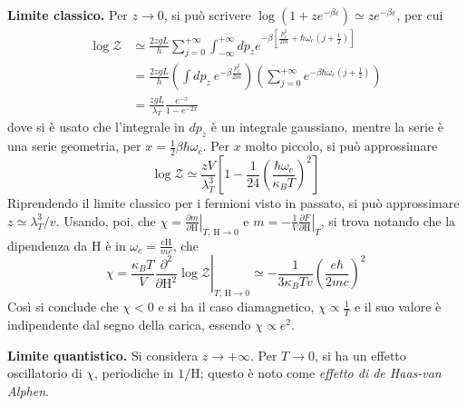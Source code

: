 \documentclass[11pt, a4paper]{scrartcl}
\theoremstyle{style}
\theoremstyle{style1}
\newcommand*\Eval[3]{\left.#1\right\rvert_{#2}^{#3}}
\numberwithin{equation}{subsection}
\begin{document}
\textbf{Limite classico.} Per $z\to 0$, si pu\`o scrivere $\log\left(1 + ze^{-\beta \varepsilon }\right) \simeq ze^{-\beta \varepsilon }$, per cui
\[
	\begin{split}
		\log\mathcal{Z}  &\simeq \frac{2zgL}{h}\sum_{j=0}^{+\infty} \int_{-\infty} ^{+\infty} dp_z e^{-\beta \left[ \frac{p_z^2}{2m}+\hbar \omega_c \left(j + \frac{1}{2}\right)  \right] }\\
				 &=\frac{2zgL}{h} \left( \int dp_z \ e^{-\beta \frac{p_z^2}{2m}} \right) \left( \sum_{j=0}^{+\infty} e^{-\beta \hbar \omega_c \left(j + \frac{1}{2}\right) } \right) \\
				 &= \frac{zgL}{\lambda _T}\frac{e^{-x}}{1 - e^{-2x}}
	\end{split}
\] 
dove si \`e usato che l'integrale in $dp_z$ \`e un integrale gaussiano, mentre la serie \`e una serie geometria, per $x = \frac{1}{2}\beta \hbar \omega_c$.
Per $x$ molto piccolo, si pu\`o approssimare
\[
\log\mathcal{Z} \simeq \frac{zV}{\lambda _T^3} \left[ 1-\frac{1}{24}\left(\frac{\hbar \omega_c}{\kappa _B T}\right) ^2 \right] 
\] 
Riprendendo il limite classico per i fermioni visto in passato, si pu\`o approssimare $z \simeq \lambda _T^3 / v$.
Usando, poi, che $\chi = \Eval{\frac{\partial m}{\partial \mathrm{H} } }{T,\, \mathrm{H} \to 0}{}$ e $m = - \frac{1}{V}\Eval{\frac{\partial F}{\partial \mathrm{H} } }{T}{}$, si trova notando che la dipendenza da $\mathrm{H} $ \`e in $\omega_c = \frac{e\mathrm{H} }{mc}$, che
\[
	\chi = \Eval{\frac{\kappa _B T }{V}\frac{\partial ^2 }{\partial \mathrm{H} ^2}  \log\mathcal{Z}}{T,\, \mathrm{H} \to  0}{} \simeq - \frac{1}{3\kappa _B T v}\left(\frac{e \hbar }{2mc}\right) ^2
\] 
Cos\`i si conclude che $\chi <0$ e si ha il caso diamagnetico, $\chi \propto \frac{1}{T}$ e il suo valore \`e indipendente dal segno della carica, essendo $\chi \propto e^2$.
\vspace{.5cm}

\textbf{Limite quantistico.} Si considera $z\to +\infty$. 
Per $T\to 0$, si ha un effetto oscillatorio di $\chi $, periodiche in $1 / \mathrm{H} $; questo \`e noto come \textit{effetto di de Haas-van Alphen}.
\end{document}
